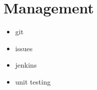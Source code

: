 \chapter{Management}
\label{chap:management}


\begin{itemize}
  \item git
  \item issues
  \item jenkins
  \item unit testing
\end{itemize}


